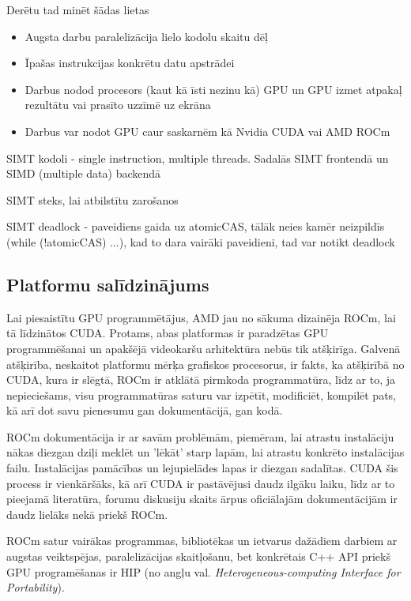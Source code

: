 \documentclass[12pt]{report}%
\theoremstyle{definition}
\begin{document}
Derētu tad minēt šādas lietas
\begin{itemize}
   \item Augsta darbu paralelizācija lielo kodolu skaitu dēļ
   \item Īpašas instrukcijas konkrētu datu apstrādei
   \item Darbus nodod procesors (kaut kā īsti nezinu kā) GPU un GPU izmet atpakaļ rezultātu vai prasīto uzzīmē uz ekrāna
   \item Darbus var nodot GPU caur saskarnēm kā Nvidia CUDA vai AMD ROCm
\end{itemize}

SIMT kodoli - single instruction, multiple threads. Sadalās SIMT frontendā un SIMD (multiple data) backendā

SIMT steks, lai atbilstītu zarošanos

SIMT deadlock - paveidiens gaida uz atomicCAS, tālāk neies kamēr neizpildīs (while (!atomicCAS) ...), kad to dara vairāki paveidieni, tad var notikt deadlock

\begin{center}
\chapter{Platformu salīdzinājums}
\end{center}
Lai piesaistītu GPU programmētājus, AMD jau no sākuma dizainēja ROCm, lai tā līdzinātos CUDA. Protams,
abas platformas ir paradzētas GPU programmēšanai un apakšējā videokaršu arhitektūra nebūs tik atšķirīga.
Galvenā atšķirība, neskaitot platformu mērķa grafiskos procesorus, ir fakts, ka atšķirībā no CUDA, kura
ir slēgtā, ROCm ir atklātā pirmkoda programmatūra, līdz ar to, ja nepieciešams, visu programmatūras saturu 
var izpētīt, modificiēt, kompilēt pats, kā arī dot savu pienesumu gan dokumentācijā, gan kodā.\cite{what_is_ROCM}

ROCm dokumentācija ir ar savām problēmām, piemēram, lai atrastu instalāciju nākas diezgan dziļi meklēt
un 'lēkāt' starp lapām, lai atrastu konkrēto instalācijas failu. Instalācijas pamācības un lejupielādes
lapas ir diezgan sadalītas. CUDA šis process ir vienkāršāks, kā arī CUDA ir pastāvējusi daudz ilgāku
laiku, līdz ar to pieejamā literatūra, forumu diskusiju skaits ārpus oficiālajām dokumentācijām ir daudz 
lielāks nekā priekš ROCm.

ROCm satur vairākas programmas, bibliotēkas un ietvarus dažādiem darbiem ar augstas veiktspējas,
paralelizācijas skaitļošanu, bet konkrētais C++ API priekš GPU programēšanas ir HIP (no angļu val.
\textit{Heterogeneous-computing Interface for Portability}).\cite{HIP_docs}
\end{document}
